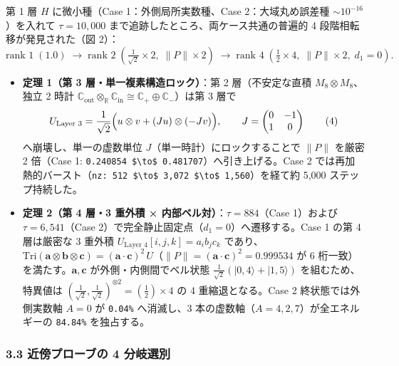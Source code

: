 \documentclass[
  a4paper,
]{ltjsarticle}
\providecommand{\tightlist}{%
  \setlength{\itemsep}{0pt}\setlength{\parskip}{0pt}}
\begin{document}
第 1 層 \(H\) に微小種（Case 1：外側局所実数種、Case 2：大域丸め誤差種
\(\sim 10^{-16}\)）を入れて \(\tau = 10{,}000\)
まで追跡したところ、両ケース共通の普遍的 4 段階相転移が発見された（図
2）：
\[\text{rank } 1\;(1.0) \;\longrightarrow\; \text{rank } 2\;\left(\tfrac{1}{\sqrt{2}}\times 2,\; \|P\|\times 2\right) \;\longrightarrow\; \text{rank } 4\;\left(\tfrac{1}{2}\times 4,\; \|P\|\times 2,\; d_1 = 0\right). \tag{3}\]

\begin{itemize}
\tightlist
\item
  \textbf{定理 1（第 3 層・単一複素構造ロック）}：第 2 層（不安定な直積
  \(M_8 \otimes M_8\)、独立 2 時計
  \(\mathbb{C}_{\mathrm{out}}\otimes_{\mathbb{R}}\mathbb{C}_{\mathrm{in}} \cong \mathbb{C}_+ \oplus \mathbb{C}_-\)）は第
  3 層で
  \[U_{\text{Layer 3}} = \frac{1}{\sqrt{2}}\Bigl(u\otimes v + (Ju)\otimes(-Jv)\Bigr), \qquad J = \begin{pmatrix}0 & -1\\ 1 & 0\end{pmatrix} \tag{4}\]
  へ崩壊し、単一の虚数単位 \(J\)（単一時計）にロックすることで \(\|P\|\)
  を厳密 2 倍（Case 1:
  \texttt{0.240854\ \$\textbackslash{}to\$\ 0.481707}）へ引き上げる。Case
  2
  では再加熱的バースト（\texttt{nz:\ 512\ \$\textbackslash{}to\$\ 3,072\ \$\textbackslash{}to\$\ 1,560}）を経て約
  5,000 ステップ持続した。
\item
  \textbf{定理 2（第 4 層・3 重外積 ×
  内部ベル対）}：\(\tau = 884\)（Case 1）および \(\tau = 6{,}541\)（Case
  2）で完全静止固定点（\(d_1 = 0\)）へ遷移する。Case 1 の第 4 層は厳密な
  3 重外積 \(U_{\text{Layer 4}}[i,j,k] = a_i b_j c_k\)
  であり、\(\mathrm{Tri}(\mathbf{a}\otimes\mathbf{b}\otimes\mathbf{c}) = (\mathbf{a}\cdot\mathbf{c})^2\,U\)（\(\|P\| = (\mathbf{a}\cdot\mathbf{c})^2 = 0.999534\)
  が 6 桁一致）を満たす。\(\mathbf{a}, \mathbf{c}\)
  が外側・内側間でベル状態
  \(\frac{1}{\sqrt{2}}(|0,4\rangle + |1,5\rangle)\) を組むため、特異値は
  \(\left(\frac{1}{\sqrt{2}},\frac{1}{\sqrt{2}}\right)^{\otimes 2} = \left(\frac{1}{2}\right)\times 4\)
  の 4 重縮退となる。Case 2 終状態では外側実数軸 \(A=0\) が
  \texttt{0.04\%} へ消滅し、3 本の虚数軸（\(A=4,2,7\)）が全エネルギーの
  \texttt{84.84\%} を独占する。
\end{itemize}

\subsubsection{3.3 近傍プローブの 4
分岐選別}\label{ux8fd1ux508dux30d7ux30edux30fcux30d6ux306e-4-ux5206ux5c90ux9078ux5225}
\end{document}
